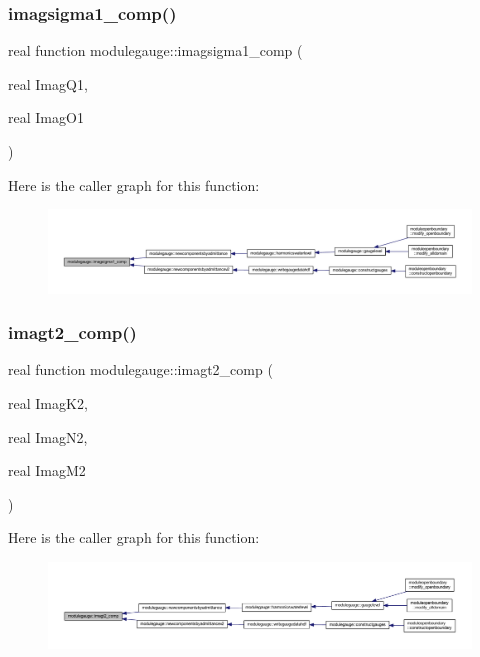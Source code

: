 \subsubsection{\texorpdfstring{imagsigma1\+\_\+comp()}{imagsigma1\_comp()}}
{\footnotesize\ttfamily real function modulegauge\+::imagsigma1\+\_\+comp (\begin{DoxyParamCaption}\item[{real}]{Imag\+Q1,  }\item[{real}]{Imag\+O1 }\end{DoxyParamCaption})\hspace{0.3cm}{\ttfamily [private]}}

Here is the caller graph for this function\+:\nopagebreak
\begin{figure}[H]
\begin{center}
\leavevmode
\includegraphics[width=350pt]{namespacemodulegauge_af07cc0a3df0d15cac79f031de3fb79a7_icgraph}
\end{center}
\end{figure}
\mbox{\label{namespacemodulegauge_a2dcd9bdfab5c9c98762f6cc509efd8ae}} 
\subsubsection{\texorpdfstring{imagt2\+\_\+comp()}{imagt2\_comp()}}
{\footnotesize\ttfamily real function modulegauge\+::imagt2\+\_\+comp (\begin{DoxyParamCaption}\item[{real}]{Imag\+K2,  }\item[{real}]{Imag\+N2,  }\item[{real}]{Imag\+M2 }\end{DoxyParamCaption})\hspace{0.3cm}{\ttfamily [private]}}

Here is the caller graph for this function\+:\nopagebreak
\begin{figure}[H]
\begin{center}
\leavevmode
\includegraphics[width=350pt]{namespacemodulegauge_a2dcd9bdfab5c9c98762f6cc509efd8ae_icgraph}
\end{center}
\end{figure}
\mbox{\label{namespacemodulegauge_a2e204b866f8da90453f9d7af3fd23ec6}} 
